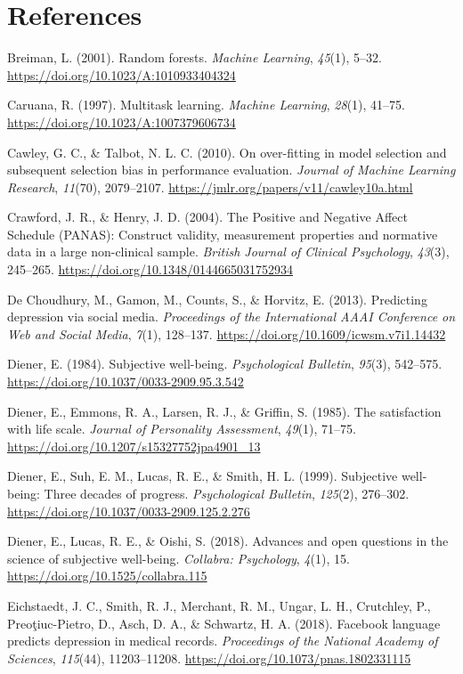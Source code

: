 \documentclass[11pt,letterpaper]{article}
\newcommand{\APAref}{\par\noindent\hangindent=0.5in\hangafter=1\relax}
\begin{document}
\FloatBarrier

\section{References}\label{references}

\APAref Breiman, L. (2001). Random forests. \emph{Machine Learning}, \emph{45}(1), 5--32. \url{https://doi.org/10.1023/A:1010933404324}

\APAref Caruana, R. (1997). Multitask learning. \emph{Machine Learning}, \emph{28}(1), 41--75. \url{https://doi.org/10.1023/A:1007379606734}

\APAref Cawley, G. C., \& Talbot, N. L. C. (2010). On over-fitting in model selection and subsequent selection bias in performance evaluation. \emph{Journal of Machine Learning Research}, \emph{11}(70), 2079--2107. \url{https://jmlr.org/papers/v11/cawley10a.html}

\APAref Crawford, J. R., \& Henry, J. D. (2004). The Positive and Negative Affect Schedule (PANAS): Construct validity, measurement properties and normative data in a large non-clinical sample. \emph{British Journal of Clinical Psychology}, \emph{43}(3), 245--265. \url{https://doi.org/10.1348/0144665031752934}

\APAref De Choudhury, M., Gamon, M., Counts, S., \& Horvitz, E. (2013). Predicting depression via social media. \emph{Proceedings of the International AAAI Conference on Web and Social Media}, \emph{7}(1), 128--137. \url{https://doi.org/10.1609/icwsm.v7i1.14432}

\APAref Diener, E. (1984). Subjective well-being. \emph{Psychological Bulletin}, \emph{95}(3), 542--575. \url{https://doi.org/10.1037/0033-2909.95.3.542}

\APAref Diener, E., Emmons, R. A., Larsen, R. J., \& Griffin, S. (1985). The satisfaction with life scale. \emph{Journal of Personality Assessment}, \emph{49}(1), 71--75. \url{https://doi.org/10.1207/s15327752jpa4901_13}

\APAref Diener, E., Suh, E. M., Lucas, R. E., \& Smith, H. L. (1999). Subjective well-being: Three decades of progress. \emph{Psychological Bulletin}, \emph{125}(2), 276--302. \url{https://doi.org/10.1037/0033-2909.125.2.276}

\APAref Diener, E., Lucas, R. E., \& Oishi, S. (2018). Advances and open questions in the science of subjective well-being. \emph{Collabra: Psychology}, \emph{4}(1), 15. \url{https://doi.org/10.1525/collabra.115}

\APAref Eichstaedt, J. C., Smith, R. J., Merchant, R. M., Ungar, L. H., Crutchley, P., Preoţiuc-Pietro, D., Asch, D. A., \& Schwartz, H. A. (2018). Facebook language predicts depression in medical records. \emph{Proceedings of the National Academy of Sciences}, \emph{115}(44), 11203--11208. \url{https://doi.org/10.1073/pnas.1802331115}
\end{document}
